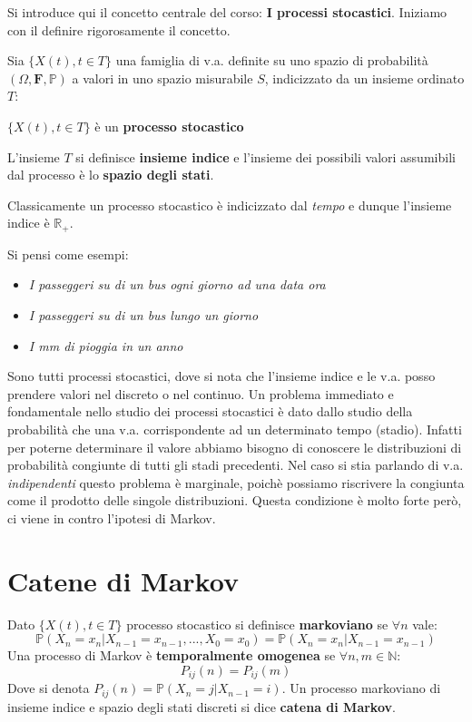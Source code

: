 Si introduce qui il concetto centrale del corso: \textbf{I processi stocastici}.
Iniziamo con il definire rigorosamente il concetto.
\begin{definition}
Sia $\{X(t),t\in T\}$ una famiglia di v.a. definite su uno spazio di probabilità $(\Omega,\mathbf{F},\mathbb{P})$ a valori in uno spazio misurabile $S$, indicizzato da un insieme ordinato $T$:
\begin{center}
    $\{X(t),t\in T\}$ è un \textbf{processo stocastico}
\end{center}
L'insieme $T$ si definisce \textbf{insieme indice} e l'insieme dei possibili valori assumibili dal processo è lo \textbf{spazio degli stati}.
\end{definition}

Classicamente un processo stocastico è indicizzato dal \textit{tempo} e dunque l'insieme indice è $\mathbb{R}_+$.
\begin{example}
Si pensi come esempi:
\begin{itemize}
    \item \textit{I passeggeri su di un bus ogni giorno ad una data ora}
    \item \textit{I passeggeri su di un bus lungo un giorno}
    \item \textit{I mm di pioggia in un anno}
\end{itemize}
\end{example}
Sono tutti processi stocastici, dove si nota che l'insieme indice e le v.a. posso prendere valori nel discreto o nel continuo. 
Un problema immediato e fondamentale nello studio dei processi stocastici è dato dallo studio della probabilità che una v.a. corrispondente ad un determinato tempo (stadio). Infatti per poterne determinare il valore abbiamo bisogno di conoscere le distribuzioni di probabilità congiunte di tutti gli stadi precedenti. Nel caso si stia parlando di v.a. \textit{indipendenti} questo problema è marginale, poichè possiamo riscrivere la congiunta come il prodotto delle singole distribuzioni. Questa condizione è molto forte però, ci viene in contro l'ipotesi di Markov.
\section{Catene di Markov}
\begin{definition}
Dato $\{X(t),t\in T\}$ processo stocastico si definisce \textbf{markoviano} se $\forall n$ vale:
\[\mathbb{P}(X_n=x_n|X_{n-1}=x_{n-1},...,X_0=x_0)=\mathbb{P}(X_n=x_n|X_{n-1}=x_{n-1})\]
Una processo di Markov è \textbf{temporalmente omogenea} se $\forall n,m\in\mathbb{N}$: \[P_{ij}(n)=P_{ij}(m)\]
Dove si denota $P_{ij}(n)=\mathbb{P}(X_n=j|X_{n-1}=i)$.
\newline
Un processo markoviano di insieme indice e spazio degli stati discreti si dice \textbf{catena di Markov}.
\end{definition}

